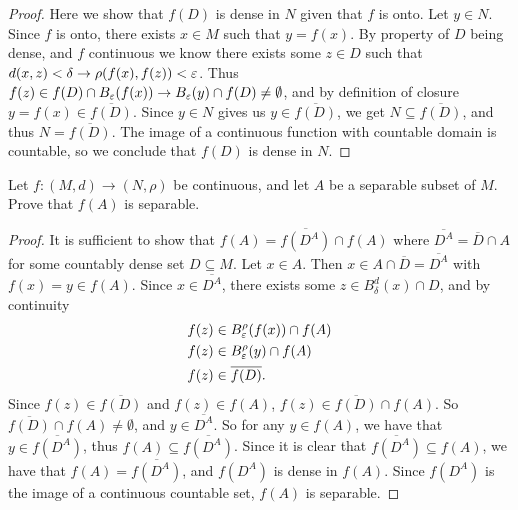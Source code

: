 \documentclass{exam}
\begin{document}
\begin{questions}
\begin{proof}
        Here we show that $f(D)$ is dense in $N$ given that $f$ is onto. Let $y\in N$. Since $f$ is onto, there exists $x\in M$ such that $y = f(x)$. By property of $D$ being dense,
        and $f$ continuous we know there exists some $z\in D$ such that $d(x, z) < \delta \rightarrow \rho (f(x), f(z)) < \varepsilon$. 
        Thus $f(z) \in f(D)\cap B_\varepsilon (f(x)) \rightarrow B_\varepsilon(y)\cap f(D)\neq\emptyset$, and by definition of closure $y = f(x)\in \overline{f(D)}$. Since $y\in N$ gives us
        $y\in \overline{f(D)}$, we get $N \subseteq \overline{f(D)}$, and thus $N = \overline{f(D)}$. The image of a continuous function with countable domain is countable, so
        we conclude that $f(D)$ is dense in $N$.
    \end{proof}


    \newpage
    \question Let $f: (M, d)\to (N, \rho)$ be continuous, and let $A$ be a separable subset of $M$. Prove that $f(A)$ is separable.
    \begin{proof}
        It is sufficient to show that $f(A) = \overline{f(D^A)}\cap f(A)$ where $\overline{D^A} = \overline{D} \cap A$ for some countably dense set $D\subseteq M$. Let $x\in A$. Then $x\in A \cap \overline{D} = \overline{D^A}$
        with $f(x) = y\in f(A)$. Since $x\in\overline{D^A}$, there exists some $z\in B_\delta^d(x)\cap D$, and by continuity 
        \begin{align*}
            f(z) &\in B_\varepsilon^\rho (f(x))\cap f(A) \\
            f(z) &\in B_\varepsilon^\rho (y)\cap f(A) \\
            f(z) &\in \overline{f(D)}.
        \end{align*}
        Since $f(z)\in\overline{f(D)}$ and $f(z)\in f(A)$, $f(z)\in \overline{f(D)}\cap f(A)$. So $\overline{f(D)}\cap f(A) \neq \emptyset$, and
        $y\in \overline{D^A}$. So for any $y\in f(A)$, we have that $y\in \overline{f(D^A)}$, thus $f(A) \subseteq \overline{f(D^A)}$. 
        Since it is clear that $\overline{f(D^A)} \subseteq f(A)$, we have that $f(A) = \overline{f(D^A)}$, and $f(D^A)$ is dense in $f(A)$.
        Since $f(D^A)$ is the image of a continuous countable set, $f(A)$ is separable.
    \end{proof}



\end{questions}
\end{document}
